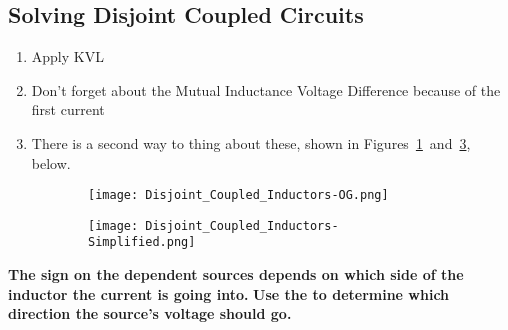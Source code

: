 	\subsection*{Solving Disjoint Coupled Circuits} \label{subsec:Solve Disjoint Coupled Circuits}
		\begin{enumerate}[noitemsep] %
			\item Apply KVL
			\item Don't forget about the Mutual Inductance Voltage Difference because of the first current
			\item There is a second way to thing about these, shown in Figures~\ref{subfig:Disjoint Coupled Inductors OG}~and~\ref{subfig:Disjoint Coupled Inductors Simplified}, below.
		\end{enumerate}
		\begin{figure}[ht!] %
			\begin{subfigure}{0.5\textwidth}
				\centering
				\texttt{[image: Disjoint\_Coupled\_Inductors-OG.png]}
				\label{subfig:Disjoint Coupled Inductors OG}
			\end{subfigure}
			\begin{subfigure}{0.5\textwidth}
				\centering
				\texttt{[image: Disjoint\_Coupled\_Inductors-Simplified.png]}
				\label{subfig:Disjoint Coupled Inductors Simplified}
			\end{subfigure}
		\end{figure}
		\textbf{The sign on the dependent sources depends on which side of the inductor the current is going into.} \newline
		\textbf{Use the  to determine which direction the source's voltage should go.}
	\vspace{-6mm}